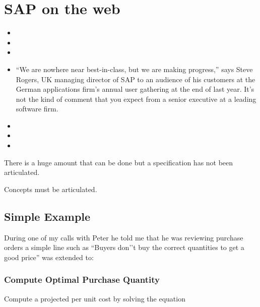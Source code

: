\documentclass[letterpaper,10pt,english]{sphinxmanual}
\begin{document}
\chapter{SAP on the web}
\label{\detokenize{BusinessProcessReengineering:sap-on-the-web}}\begin{itemize}
\item {} 

\item {} 

\item {} 

\item {} 
“We are nowhere near best-in-class, but we are making progress,” says
Steve Rogers, UK managing director of SAP to an audience of his
customers at the German applications firm’s annual user gathering at
the end of last year. It’s not the kind of comment that you expect
from a senior executive at a leading software firm.

\item {} 

\item {} 

\item {} 

\end{itemize}

There is a huge amount that can be done but a specification has not been
articulated.

Concepts must be articulated.


\section{Simple Example}
\label{\detokenize{BusinessProcessReengineering:simple-example}}
During one of my calls with Peter he told me that he was reviewing
purchase orders a simple line such as “Buyers don’’t buy the correct
quantities to get a good price” was extended to:


\subsection{Compute Optimal Purchase Quantity}
\label{\detokenize{BusinessProcessReengineering:compute-optimal-purchase-quantity}}
Compute a projected per unit cost by solving the equation
\end{document}
